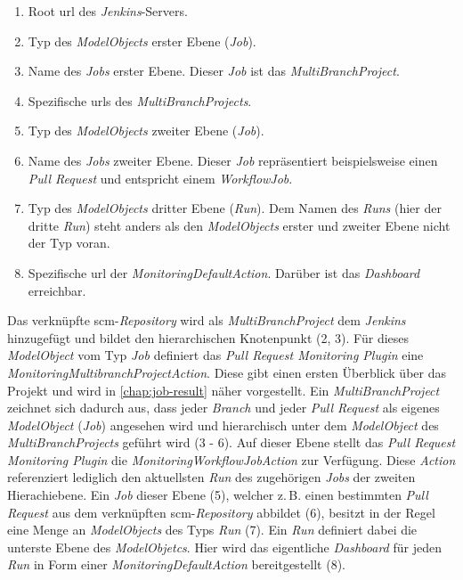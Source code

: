 \begin{enumerate}
	\item Root \ac{url} des \textit{Jenkins}-Servers.
	\item Typ des \textit{ModelObjects} erster Ebene (\textit{Job}).
	\item Name des \textit{Jobs} erster Ebene. Dieser \textit{Job} ist das \textit{MultiBranchProject}.
	\item Spezifische \acp{url} des \textit{MultiBranchProjects}.
	\item Typ des \textit{ModelObjects} zweiter Ebene (\textit{Job}).
	\item Name des \textit{Jobs} zweiter Ebene. Dieser \textit{Job} repräsentiert beispielsweise einen \textit{Pull Request} und entspricht einem \textit{WorkflowJob}.
	\item Typ des \textit{ModelObjects} dritter Ebene (\textit{Run}). Dem Namen des \textit{Runs} (hier der dritte \textit{Run}) steht anders als den \textit{ModelObjects} erster und zweiter Ebene nicht der Typ voran.
	\item Spezifische \ac{url} der \textit{MonitoringDefaultAction}. Darüber ist das \textit{Dashboard} erreichbar.
 \end{enumerate}
 
Das verknüpfte \ac{scm}-\textit{Repository} wird als \textit{MultiBranchProject} dem \textit{Jenkins} hinzugefügt und bildet den hierarchischen Knotenpunkt (2, 3). Für dieses \textit{ModelObject} vom Typ \textit{Job} definiert das \textit{Pull Request Monitoring Plugin} eine \textit{MonitoringMultibranchProjectAction}. Diese gibt einen ersten Überblick über das Projekt und wird in \autoref{chap:job-result} näher vorgestellt.
Ein \textit{MultiBranchProject} zeichnet sich dadurch aus, dass jeder \textit{Branch} und jeder \textit{Pull Request} als eigenes \textit{ModelObject} (\textit{Job}) angesehen wird und hierarchisch unter dem \textit{ModelObject} des \textit{MultiBranchProjects} geführt wird (3 - 6). Auf dieser Ebene stellt das \textit{Pull Request Monitoring Plugin} die \textit{MonitoringWorkflowJobAction} zur Verfügung. Diese \textit{Action} referenziert lediglich den aktuellsten \textit{Run} des zugehörigen \textit{Jobs} der zweiten Hierachiebene. Ein \textit{Job} dieser Ebene (5), welcher z.\,B. einen bestimmten \textit{Pull Request} aus dem verknüpften \ac{scm}-\textit{Repository} abbildet (6), besitzt in der Regel eine Menge an \textit{ModelObjects} des Typs \textit{Run} (7). Ein \textit{Run} definiert dabei die unterste Ebene des \textit{ModelObjetcs}. Hier wird das eigentliche \textit{Dashboard} für jeden \textit{Run} in Form einer \textit{MonitoringDefaultAction} bereitgestellt (8). 

